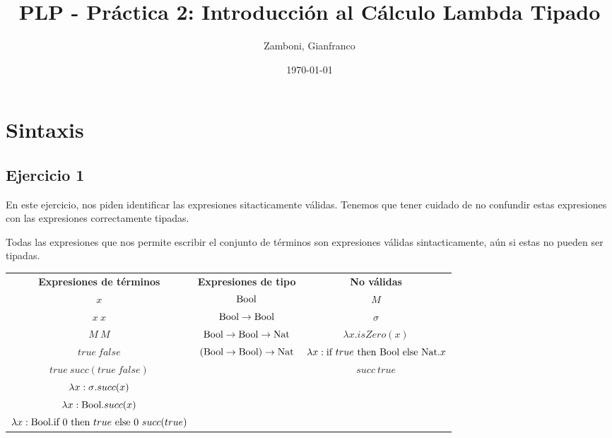 \documentclass[10pt,a4paper, landscape]{article}
\begin{document}
\title{PLP - Práctica 2: Introducción al Cálculo Lambda Tipado}

\date{\today}

\author{Zamboni, Gianfranco}

\maketitle
\setcounter{page}{1}


\section*{\centering Sintaxis}
\subsection{Ejercicio 1}
\begin{multicols}{2}
En este ejercicio, nos piden identificar las expresiones sitacticamente válidas. Tenemos que tener cuidado de no confundir estas expresiones con las expresiones correctamente tipadas. 

Todas las expresiones que nos permite escribir el conjunto de términos son expresiones válidas sintacticamente, aún si estas no pueden ser tipadas.

\end{multicols}

\vspace*{5mm}
\begin{center}
    \begin{tabular}{c|c|c}
        \textbf{Expresiones de términos} & \textbf{Expresiones de tipo} & \textbf{No válidas}\\
        
        $x$ & $\text{Bool}$ & $M$ \\ 
        $x~x$  &  $\text{Bool}\to \text{Bool}$  &  $\sigma$ \\
        $M~M$   & $\text{Bool}\to \text{Bool}\to \text{Nat}$ & $\lambda x.isZero(x)$ \\ 
        $true~false$ &  $(\text{Bool}\to \text{Bool})\to \text{Nat}$ & $\lambda x:\text{if } true \text{ then } \text{Bool} \text{ else } \text{Nat}.x$ \\ 
        $true~succ(true~false)$     &   & $succ~true$ \\ 
        ${\lambda x: \sigma \text{.} succ(x)}$ &   & \\ 
        $\lambda x: \text{Bool} \text{.} succ(x)$     &  & \\ 
        $\lambda x: \text{Bool} \text{.} \text{if } 0 \text{ then } true \text{ else } 0~succ(true)$ &  & \\ 
    \end{tabular}
\end{center}
\end{document}
